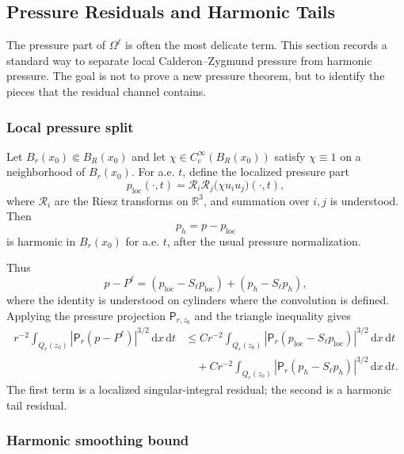 \documentclass[10pt,a4paper]{amsart}
\numberwithin{equation}{section}
\newcommand{\R}{\mathbb R}
\newcommand{\loc}{\mathrm{loc}}
\newcommand{\dxdt}{\,\mathrm dx\,\mathrm dt}
\newcommand{\Pf}{\mathsf P}
\begin{document}
\subsection{Pressure Residuals and Harmonic Tails}\label{sec:pressure-residuals}

The pressure part of $\Omega^\ell$ is often the most delicate term.  This section records a standard way to separate local Calderon--Zygmund pressure from harmonic pressure.  The goal is not to prove a new pressure theorem, but to identify the pieces that the residual channel contains.

\subsubsection{Local pressure split}

Let $B_r(x_0)\Subset B_R(x_0)$ and let $\chi\in C_c^\infty(B_R(x_0))$ satisfy $\chi\equiv1$ on a neighborhood of $B_r(x_0)$.  For a.e. $t$, define the localized pressure part
\begin{equation}\label{eq:localized-pressure-part}
p_{\loc}(\cdot,t)=\mathcal R_i\mathcal R_j\bigl(\chi u_i u_j\bigr)(\cdot,t),
\end{equation}
where $\mathcal R_i$ are the Riesz transforms on $\R^3$, and summation over $i,j$ is understood.  Then
\[
p_h=p-p_{\loc}
\]
is harmonic in $B_r(x_0)$ for a.e. $t$, after the usual pressure normalization.

Thus
\begin{equation}\label{eq:pressure-residual-split}
p-P^\ell
=(p_{\loc}-S_\ell p_{\loc})+(p_h-S_\ell p_h),
\end{equation}
where the identity is understood on cylinders where the convolution is defined.  Applying the pressure projection $\Pf_{r,z_0}$ and the triangle inequality gives
\begin{align}\label{eq:pressure-residual-local-harmonic}
r^{-2}\int_{Q_r(z_0)}|\Pf_r(p-P^\ell)|^{3/2}\dxdt
&\le
C r^{-2}\int_{Q_r(z_0)}|\Pf_r(p_{\loc}-S_\ell p_{\loc})|^{3/2}\dxdt
\nonumber\\
&\quad+
C r^{-2}\int_{Q_r(z_0)}|\Pf_r(p_h-S_\ell p_h)|^{3/2}\dxdt.
\end{align}
The first term is a localized singular-integral residual; the second is a harmonic tail residual.

\subsubsection{Harmonic smoothing bound}
\end{document}
